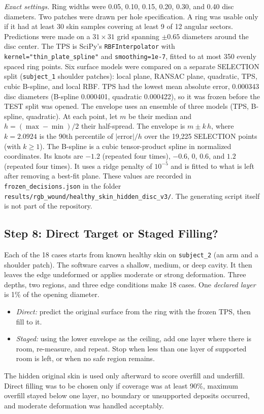 \documentclass[conference]{IEEEtran}
\begin{document}
\emph{Exact settings.} Ring widths were 0.05, 0.10, 0.15, 0.20, 0.30, and
0.40 disc diameters. Two patches were drawn per hole specification. A ring
was usable only if it had at least 30 skin samples covering at least 9 of 12
angular sectors. Predictions were made on a $31\times31$ grid spanning
$\pm0.65$ diameters around the disc center. The TPS is SciPy's
\texttt{RBFInterpolator} with \texttt{kernel="thin\_plate\_spline"} and
\texttt{smoothing=1e-7}, fitted to at most 350 evenly spaced ring points.
Six surface models were compared on a separate SELECTION split
(\texttt{subject\_1} shoulder patches): local plane, RANSAC plane,
quadratic, TPS, cubic B-spline, and local RBF. TPS had the lowest mean
absolute error, 0.000343 disc diameters (B-spline 0.000401, quadratic
0.000422), so it was frozen before the TEST split was opened. The
envelope uses an ensemble of three models (TPS, B-spline, quadratic). At
each point, let $m$ be their median and $h=(\max-\min)/2$ their half-spread.
The envelope is $m \pm k\,h$, where $k=2.0924$ is the 90th percentile of
$|\text{error}|/h$ over the 19{,}225 SELECTION points (with $k\ge1$). The
B-spline is a cubic tensor-product spline in normalized coordinates. Its
knots are $-1.2$ (repeated four times), $-0.6$, $0$, $0.6$, and $1.2$
(repeated four times). It uses a ridge penalty of $10^{-5}$ and is fitted to
what is left after
removing a best-fit plane. These values are recorded in
\texttt{frozen\_decisions.json} in the folder
\texttt{results/\allowbreak rgb\_wound/\allowbreak healthy\_skin\_hidden\_disc\_v3/}.
The generating script itself is not part of the repository.

\subsection{Step 8: Direct Target or Staged Filling?}

Each of the 18 cases starts from known healthy skin on \texttt{subject\_2}
(an arm and a shoulder patch). The software carves a shallow, medium, or
deep cavity. It then leaves the edge undeformed or applies moderate or
strong deformation. Three depths, two regions, and three edge conditions
make 18 cases. One \emph{declared layer} is 1\% of the opening diameter.
\begin{itemize}
\item \emph{Direct:} predict the original surface from the ring with the
frozen TPS, then fill to it.
\item \emph{Staged:} using the lower envelope as the ceiling, add one layer
where there is room, re-measure, and repeat. Stop when less than one layer
of supported room is left, or when no safe region remains.
\end{itemize}
The hidden original skin is used only afterward to score overfill and
underfill. Direct filling was to be chosen only if coverage was at least
90\%, maximum overfill stayed below one layer, no boundary or unsupported
deposits occurred, and moderate deformation was handled acceptably.
\end{document}
